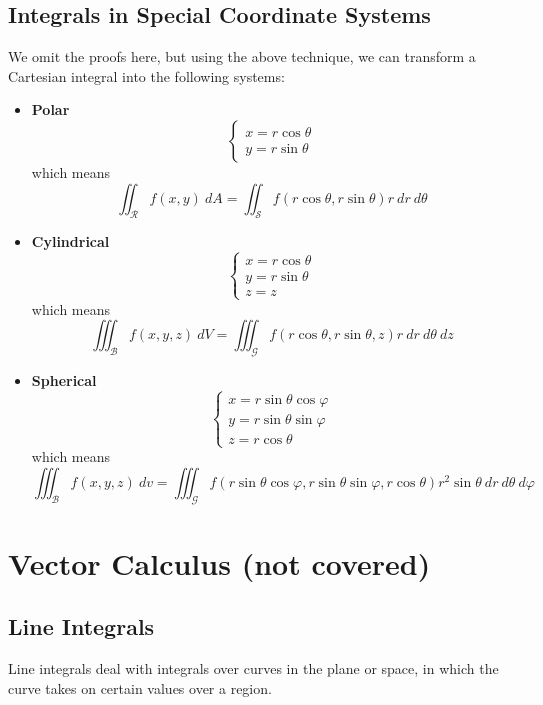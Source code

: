 \documentclass[12pt]{article}
\begin{document}
\subsection{Integrals in Special Coordinate Systems}
We omit the proofs here, but using the above technique, we can transform a Cartesian integral into the following systems:
\begin{itemize}
\item \textbf{Polar} \[ \begin{cases} x = r\cos{\theta} \\ y = r\sin{\theta} \end{cases} \] which means \[ \iint_{\mathcal{R}}f(x,y) \ dA = \iint_{\mathcal{S}}f(r\cos{\theta},r\sin{\theta}) r \ dr \ d\theta\]
\item \textbf{Cylindrical} \[ \begin{cases} x = r\cos{\theta} \\ y = r\sin{\theta} \\ z = z \end{cases} \] which means \[ \iiint_{\mathcal{B}} f(x,y,z) \ dV = \iiint_{\mathcal{G}}f(r\cos{\theta},r\sin{\theta},z) r \ dr \ d\theta \ dz \]
\item \textbf{Spherical} \[ \begin{cases} x = r\sin{\theta}\cos{\varphi} \\ y = r\sin{\theta}\sin{\varphi} \\ z = r\cos{\theta} \end{cases} \] which means \[ \iiint_{\mathcal{B}} f(x,y,z) \ dv = \iiint_{\mathcal{G}}f(r\sin{\theta}\cos{\varphi},r\sin{\theta}\sin{\varphi},r\cos{\theta}) r^2\sin{\theta} \ dr \ d\theta \ d\varphi \]
\end{itemize}
\section{Vector Calculus (not covered)} %

\subsection{Line Integrals}
Line integrals deal with integrals over curves in the plane or space, in which the curve takes on certain values over a region. 
\end{document}
